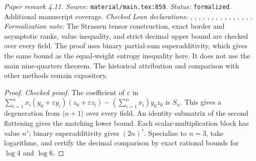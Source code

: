 \noindent\textit{Paper remark 4.11. Source:} \texttt{material/main.tex:859}.
\textit{Status:} \texttt{formalized}. Additional manuscript coverage.
\textit{Checked Lean declarations:} , , , , , , , , , , , , , , .
\textit{Formalization note:} The Strassen tensor construction, exact border and asymptotic ranks, value inequality, and strict decimal upper bound are checked over every field. The proof uses binary partial-sum superadditivity, which gives the same bound as the equal-weight entropy inequality here. It does not use the main nine-quarters theorem. The historical attribution and comparison with other methods remain expository.

\begin{proof}
\leanok
{}
\textit{Checked proof.} The coefficient of $\varepsilon$ in $\sum_{i=1}^n x_i(y_0+\varepsilon y_i)(z_0+\varepsilon z_i)-(\sum_{i=1}^n x_i)y_0z_0$ is $S_n$. This gives a degeneration from $\langle n+1\rangle$ over every field. An identity submatrix of the second flattening gives the matching lower bound. Each scalar-multiplication block has value $n^\tau$; binary superadditivity gives $(2n)^\tau$. Specialize to $n=3$, take logarithms, and certify the decimal comparison by exact rational bounds for $\log4$ and $\log6$.
\end{proof}

